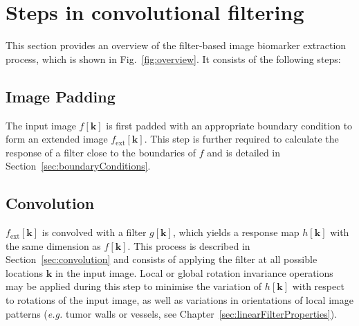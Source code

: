 \documentclass[fleqn,a4paper,oneside,openany]{book}
\begin{document}
%
\section{Steps in convolutional filtering}\label{sec:overview}
%
This section provides an overview of the filter-based image biomarker extraction process, which is shown in Fig.~\ref{fig:overview}.
It consists of the following steps:
%
\subsection{Image Padding}
%
The input image $f[\boldsymbol{k}]$ is first padded with an appropriate boundary condition to form an extended image $f_{\text{ext}}[\boldsymbol{k}]$. This step is further required to calculate the response of a filter close to the boundaries of $f$ and is detailed in Section~\ref{sec:boundaryConditions}.
%
\subsection{Convolution}
%
$f_{\text{ext}}[\boldsymbol{k}]$ is convolved with a filter $g[\boldsymbol{k}]$, which yields a response map $h[\boldsymbol{k}]$ with the same dimension as $f[\boldsymbol{k}]$.
This process is described in Section~\ref{sec:convolution} and consists of applying the filter at all possible locations $\boldsymbol{k}$ in the input image.
Local or global rotation invariance operations may be applied during this step to minimise the variation of  $h[\boldsymbol{k}]$ with respect to rotations of the input image, as well as variations in orientations of local image patterns (\textit{e.g.} tumor walls or vessels, see Chapter~\ref{sec:linearFilterProperties}).
%
\end{document}
